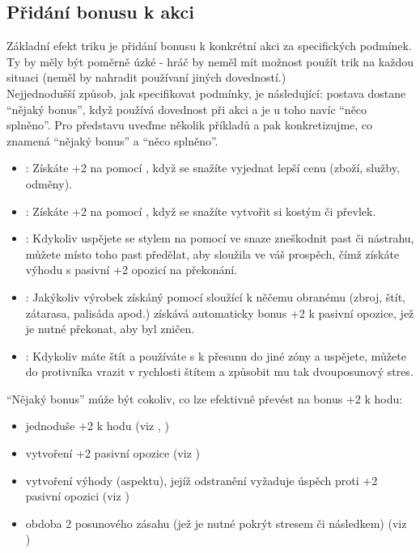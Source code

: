 \documentclass[../main.tex]{subfiles}
\begin{document}
\subsection{Přidání bonusu k akci}
\label{sec:trik-bonus}
Základní efekt triku je přidání bonusu k konkrétní akci za specifických podmínek. Ty by měly být poměrně úzké - hráč by neměl mít možnost použít trik na každou situaci (neměl by nahradit používaní jiných dovedností.)\\
Nejjednodušší způsob, jak specifikovat podmínky, je následující: postava dostane ``nějaký bonus'', když používá dovednost  při akci  a je u toho navíc ``něco splněno''. Pro představu uveďme několik příkladů a pak konkretizujme, co znamená ``nějaký bonus'' a ``něco splněno''.

\begin{itemize}
\item {}:
  Získáte +2 na  pomocí , když se snažíte vyjednat lepší cenu (zboží, služby, odměny).
\item {}:
  Získáte +2 na  pomocí , když se snažíte vytvořit si kostým či převlek.
\item {}:
  Kdykoliv uspějete se stylem na  pomocí  ve snaze zneškodnit past či nástrahu, můžete místo toho past předělat, aby sloužila ve váš prospěch, čímž získáte výhodu  s pasivní +2 opozicí na překonání.
\item {}:
  Jakýkoliv výrobek získáný  pomocí  sloužící k něčemu obranému (zbroj, štít, zátarasa, palisáda apod.) získává automaticky bonus +2 k pasivní opozice, jež je nutné překonat, aby byl zničen.
\item {}:
  Kdykoliv máte štít a používáte  s  k přesunu do jiné zóny a uspějete, můžete do protivníka vrazit v rychlosti štítem a způsobit mu tak dvouposunový stres.

\end{itemize}
``Nějaký bonus'' může být cokoliv, co lze efektivně převést na bonus +2 k hodu:

\begin{itemize}
\item jednoduše +2 k hodu (viz , )
\item vytvoření +2 pasivní opozice (viz )
\item vytvoření výhody (aspektu), jejíž odstranění vyžaduje úspěch proti +2 pasivní opozici (viz )
\item obdoba 2 posunového zásahu (jež je nutné pokrýt stresem či následkem) (viz )
\end{itemize}
\end{document}

